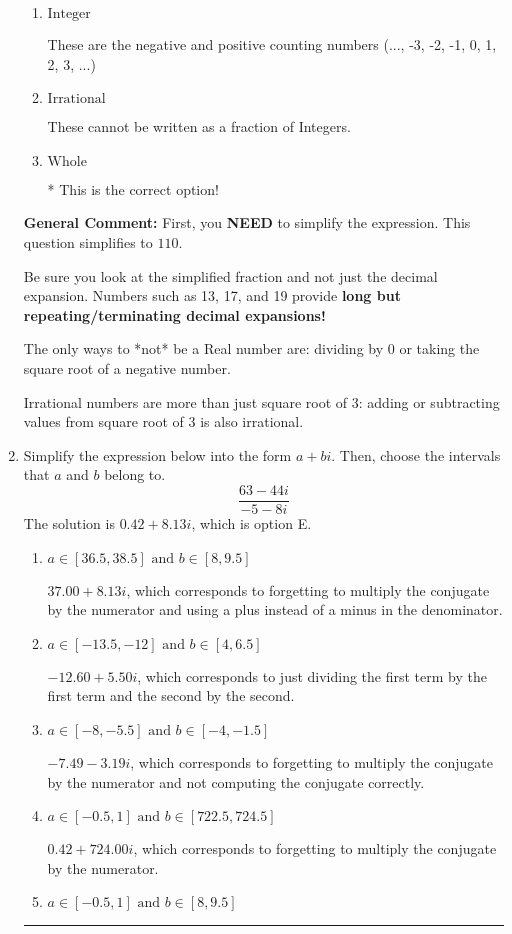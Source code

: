 \documentclass{extbook}[14pt]
\newcommand{\litem}[1]{\item #1

\rule{\textwidth}{0.4pt}}
\begin{document}
\begin{enumerate}
{\begin{enumerate}[label=\Alph*.]
These are numbers that can be written as fraction of Integers (e.g., -2/3)
\item \( \text{Integer} \)

These are the negative and positive counting numbers (..., -3, -2, -1, 0, 1, 2, 3, ...)
\item \( \text{Irrational} \)

These cannot be written as a fraction of Integers.
\item \( \text{Whole} \)

* This is the correct option!
\end{enumerate}

\textbf{General Comment:} First, you \textbf{NEED} to simplify the expression. This question simplifies to $110$. 
 
 Be sure you look at the simplified fraction and not just the decimal expansion. Numbers such as 13, 17, and 19 provide \textbf{long but repeating/terminating decimal expansions!} 
 
 The only ways to *not* be a Real number are: dividing by 0 or taking the square root of a negative number. 
 
 Irrational numbers are more than just square root of 3: adding or subtracting values from square root of 3 is also irrational.
}
\litem{
Simplify the expression below into the form $a+bi$. Then, choose the intervals that $a$ and $b$ belong to.
\[ \frac{63 - 44 i}{-5 - 8 i} \]
The solution is \( 0.42  + 8.13 i \), which is option E.\begin{enumerate}[label=\Alph*.]
\item \( a \in [36.5, 38.5] \text{ and } b \in [8, 9.5] \)

 $37.00  + 8.13 i$, which corresponds to forgetting to multiply the conjugate by the numerator and using a plus instead of a minus in the denominator.
\item \( a \in [-13.5, -12] \text{ and } b \in [4, 6.5] \)

 $-12.60  + 5.50 i$, which corresponds to just dividing the first term by the first term and the second by the second.
\item \( a \in [-8, -5.5] \text{ and } b \in [-4, -1.5] \)

 $-7.49  - 3.19 i$, which corresponds to forgetting to multiply the conjugate by the numerator and not computing the conjugate correctly.
\item \( a \in [-0.5, 1] \text{ and } b \in [722.5, 724.5] \)

 $0.42  + 724.00 i$, which corresponds to forgetting to multiply the conjugate by the numerator.
\item \( a \in [-0.5, 1] \text{ and } b \in [8, 9.5] \)


\end{enumerate}}
\end{enumerate}
\end{document}
